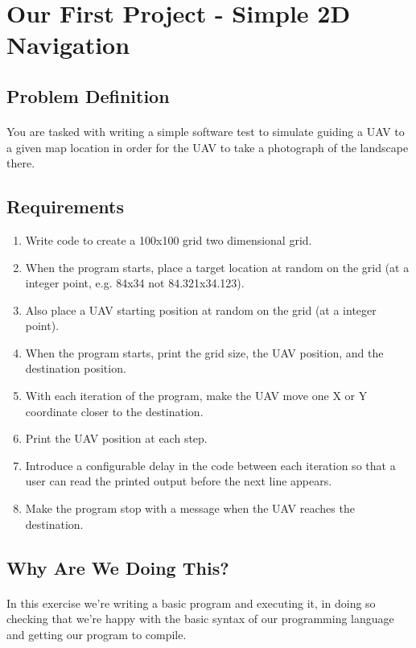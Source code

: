 \documentclass[11pt]{book}
\begin{document}
\section{Our First Project - Simple 2D Navigation}

\subsection{Problem Definition}

\paragraph{} You are tasked with writing a simple software test to simulate
guiding a UAV to a given map location in order for the UAV to take a
photograph of the landscape there. 

\subsection{Requirements}

\begin{enumerate}
\item Write code to create a 100x100 grid two dimensional grid.
\item When the program starts, place a target location at random on the grid (at a integer point, e.g. 84x34 not 84.321x34.123).
\item Also place a UAV starting position at random on the grid (at a integer point).
\item When the program starts, print the grid size, the UAV position, and the destination position.
\item With each iteration of the program, make the UAV move one X or Y coordinate closer to the destination.
\item Print the UAV position at each step.
\item Introduce a configurable delay in the code between each iteration so that a user can read the printed output before the next line appears.
\item Make the program stop with a message when the UAV reaches the destination.
\end{enumerate}

\subsection{Why Are We Doing This?}

\paragraph{} In this exercise we're writing a basic program and executing it,
in doing so checking that we're happy with the basic syntax of our programming
language and getting our program to compile.
\end{document}
